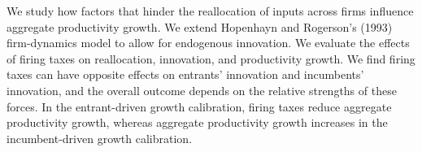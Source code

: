 We study how factors that hinder the reallocation of inputs across firms influence aggregate productivity growth. We extend Hopenhayn and Rogerson's (1993) firm-dynamics model to allow for endogenous innovation. We evaluate the effects of firing taxes on reallocation, innovation, and productivity growth. We find firing taxes can have opposite effects on entrants' innovation and incumbents' innovation, and the overall outcome depends on the relative strengths of these forces. In the entrant-driven growth calibration, firing taxes reduce aggregate productivity growth, whereas aggregate productivity growth increases in the incumbent-driven growth calibration. 